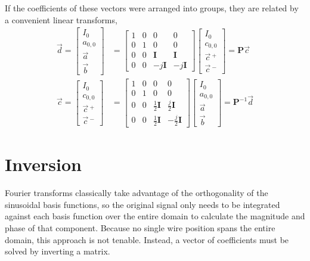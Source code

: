 \documentclass{article}
\begin{document}
If the coefficients of these vectors were arranged into groups, they are related by a convenient linear transforms,
\begin{align}
\vec{d} = \left[\begin{array}{c}
I_0\\
a_{0,0}\\
\vec{a}\\
\vec{b}
\end{array}\right] &= 
\left[\begin{array}{cccc}
1 & 0 & 0 & 0\\
0 & 1 & 0 & 0\\
0 & 0 & \mathbf{I} & \mathbf{I}\\
0 & 0 & -j\mathbf{I} & -j\mathbf{I}
\end{array}\right]
\left[\begin{array}{c}
I_0\\
c_{0,0}\\
\vec{c}\,^+\\
\vec{c}\,^-
\end{array}\right] = \mathbf{P} \vec{c}\\
\vec{c} = \left[\begin{array}{c}
I_0\\
c_{0,0}\\
\vec{c}\,^+\\
\vec{c}\,^-
\end{array}\right] &= 
\left[\begin{array}{cccc}
1 & 0 & 0 & 0\\
0 & 1 & 0 & 0\\
0 & 0 & \frac{1}{2} \mathbf{I} & \frac{j}{2} \mathbf{I}\\
0 & 0 & \frac{1}{2} \mathbf{I} & -\frac{j}{2} \mathbf{I}
\end{array}\right]
\left[\begin{array}{c}
I_0\\
a_{0,0}\\
\vec{a}\\
\vec{b}
\end{array}\right] = \mathbf{P}^{-1} \vec{d}
\end{align}


\section{Inversion}

Fourier transforms classically take advantage of the orthogonality of the sinusoidal basis functions, so the original signal only needs to be integrated against each basis function over the entire domain to calculate the magnitude and phase of that component.  Because no single wire position spans the entire domain, this approach is not tenable.  Instead, a vector of coefficients must be solved by inverting a matrix.
\end{document}
